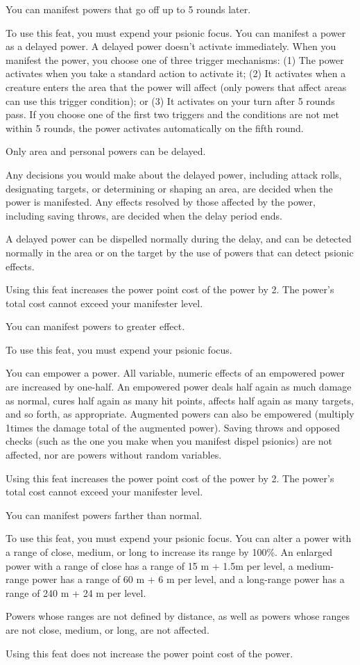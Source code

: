 {You can manifest powers that go off up to 5 rounds later.}
{}
{To use this feat, you must expend your psionic focus. You can manifest a power as a delayed power. A delayed power doesn't activate immediately. When you manifest the power, you choose one of three trigger mechanisms: (1) The power activates when you take a standard action to activate it; (2) It activates when a creature enters the area that the power will affect (only powers that affect areas can use this trigger condition); or (3) It activates on your turn after 5 rounds pass. If you choose one of the first two triggers and the conditions are not met within 5 rounds, the power activates automatically on the fifth round.

Only area and personal powers can be delayed.

Any decisions you would make about the delayed power, including attack rolls, designating targets, or determining or shaping an area, are decided when the power is manifested. Any effects resolved by those affected by the power, including saving throws, are decided when the delay period ends.

A delayed power can be dispelled normally during the delay, and can be detected normally in the area or on the target by the use of powers that can detect psionic effects.

Using this feat increases the power point cost of the power by 2. The power's total cost cannot exceed your manifester level.}{}{}

{You can manifest powers to greater effect.}
{}
{To use this feat, you must expend your psionic focus.

You can empower a power. All variable, numeric effects of an empowered power are increased by one-half. An empowered power deals half again as much damage as normal, cures half again as many hit points, affects half again as many targets, and so forth, as appropriate. Augmented powers can also be empowered (multiply 1\onehalf times the damage total of the augmented power). Saving throws and opposed checks (such as the one you make when you manifest dispel psionics) are not affected, nor are powers without random variables.

Using this feat increases the power point cost of the power by 2. The power's total cost cannot exceed your manifester level.}{}{}

{You can manifest powers farther than normal.}
{}
{To use this feat, you must expend your psionic focus. You can alter a power with a range of close, medium, or long to increase its range by 100\%. An enlarged power with a range of close has a range of 15 m + 1.5m per level, a medium-range power has a range of 60 m + 6 m per level, and a long-range power has a range of 240 m + 24 m per level.

Powers whose ranges are not defined by distance, as well as powers whose ranges are not close, medium, or long, are not affected.

Using this feat does not increase the power point cost of the power.}{}{}

